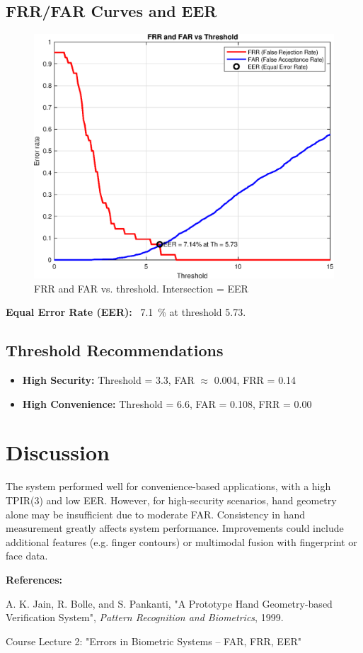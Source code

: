 \documentclass[a4paper,11pt]{article}
\begin{document}
\subsection{FRR/FAR Curves and EER}
\begin{figure}[H]
    \centering
    \includegraphics[width=0.75\linewidth]{figures/eer_plot.eps}
    \caption{FRR and FAR vs. threshold. Intersection = EER}
\end{figure}

\textbf{Equal Error Rate (EER):} ~\SI{7.1}{\percent} at threshold \SI{5.73}{}.

\subsection{Threshold Recommendations}
\begin{itemize}
    \item \textbf{High Security:} Threshold = 3.3, FAR $\approx$ 0.004, FRR = 0.14
    \item \textbf{High Convenience:} Threshold = 6.6, FAR = 0.108, FRR = 0.00
\end{itemize}

\section{Discussion}
The system performed well for convenience-based applications, with a high TPIR(3) and low EER. However, for high-security scenarios, hand geometry alone may be insufficient due to moderate FAR. Consistency in hand measurement greatly affects system performance. Improvements could include additional features (e.g. finger contours) or multimodal fusion with fingerprint or face data.

\vspace{1em}
\noindent\textbf{References:}
\begin{enumerate}[label={[R\arabic*]}]
\item A. K. Jain, R. Bolle, and S. Pankanti, "A Prototype Hand Geometry-based Verification System", \emph{Pattern Recognition and Biometrics}, 1999.
\item Course Lecture 2: "Errors in Biometric Systems – FAR, FRR, EER"
\end{enumerate}
\end{document}
